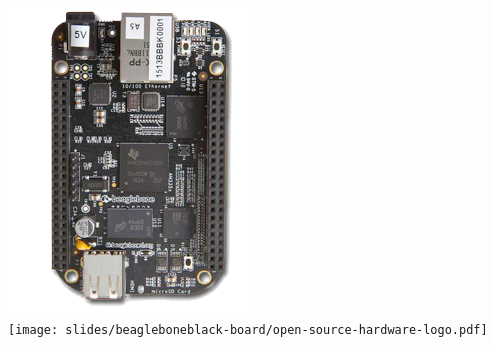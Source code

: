 \begin{frame}
\begin{columns}
\begin{center}
      \includegraphics[width=\textwidth]{slides/beagleboneblack-board/beagleboneblack.png}\\
      \texttt{[image: slides/beagleboneblack-board/open-source-hardware-logo.pdf]}
    \end{center}
  \end{columns}
\end{frame}
